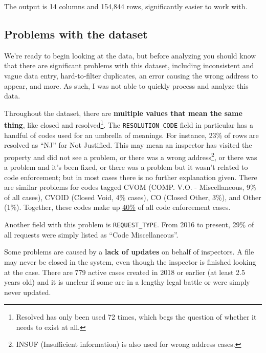 \documentclass[
]{book}
\begin{document}
The output is 14 columns and 154,844 rows, significantly easier to work with.

\hypertarget{problems-with-the-dataset}{%
\subsection{Problems with the dataset}\label{problems-with-the-dataset}}

We're ready to begin looking at the data, but before analyzing you should know that there are significant problems with this dataset, including inconsistent and vague data entry, hard-to-filter duplicates, an error causing the wrong address to appear, and more. As such, I was not able to quickly process and analyze this data.

Throughout the dataset, there are \textbf{multiple values that mean the same thing}, like closed and resolved\footnote{Resolved has only been used 72 times, which begs the question of whether it needs to exist at all.}. The \texttt{RESOLUTION\_CODE} field in particular has a handful of codes used for an umbrella of meanings. For instance, 23\% of rows are resolved as ``NJ'' for Not Justified. This may mean an inspector has visited the property and did not see a problem, or there was a wrong address\footnote{INSUF (Insufficient information) is also used for wrong address cases.}, or there was a problem and it's been fixed, or there was a problem but it wasn't related to code enforcement; but in most cases there is no further explanation given. There are similar problems for codes tagged CVOM (COMP. V.O. - Miscellaneous, 9\% of all cases), CVOID (Closed Void, 4\% cases), CO (Closed Other, 3\%), and Other (1\%). Together, these codes make up \underline{40\%} of all code enforcement cases.

Another field with this problem is \texttt{REQUEST\_TYPE}. From 2016 to present, 29\% of all requests were simply listed as ``Code Miscellaneous''.

Some problems are caused by a \textbf{lack of updates} on behalf of inspectors. A file may never be closed in the system, even though the inspector is finished looking at the case. There are 779 active cases created in 2018 or earlier (at least 2.5 years old) and it is unclear if some are in a lengthy legal battle or were simply never updated.
\end{document}
